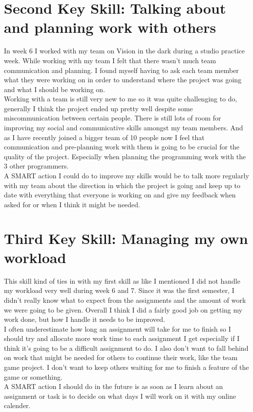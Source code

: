 \documentclass{scrartcl}
\begin{document}
\section{Second Key Skill: Talking about and planning work with others}

In week 6 I worked with my team on Vision in the dark during a studio practice week. While working with my team I felt that there wasn't much team communication and planning. I found myself having to ask each team member what they were working on in order to understand where the project was going and what I should be working on.
\\
Working with a team is still very new to me so it was quite challenging to do, generally I think the project ended up pretty well despite some miscommunication between certain people. There is still lots of room for improving my social and communicative skills amongst my team members. And as I have recently joined a bigger team of 10 people now I feel that communication and pre-planning work with them is going to be crucial for the quality of the project. Especially when planning the programming work with the 3 other programmers.
\\
A SMART action I could do to improve my skills would be to talk more regularly with my team about the direction in which the project is going and keep up to date with everything that everyone is working on and give my feedback when asked for or when I think it might be needed.

\section{Third Key Skill: Managing my own workload}

This skill kind of ties in with my first skill as like I mentioned I did not handle my workload very well during week 6 and 7. Since it was the first semester, I didn't really know what to expect from the assignments and the amount of work we were going to be given. Overall I think I did a fairly good job on getting my work done, but how I handle it needs to be improved.
\\
I often underestimate how long an assignment will take for me to finish so I should try and allocate more work time to each assignment I get especially if I think it's going to be a difficult assignment to do.
I also don't want to fall behind on work that might be needed for others to continue their work, like the team game project. I don't want to keep others waiting for me to finish a feature of the game or something.
\\
A SMART action I should do in the future is as soon as I learn about an assignment or task is to decide on what days I will work on it with my online calender.
\end{document}
